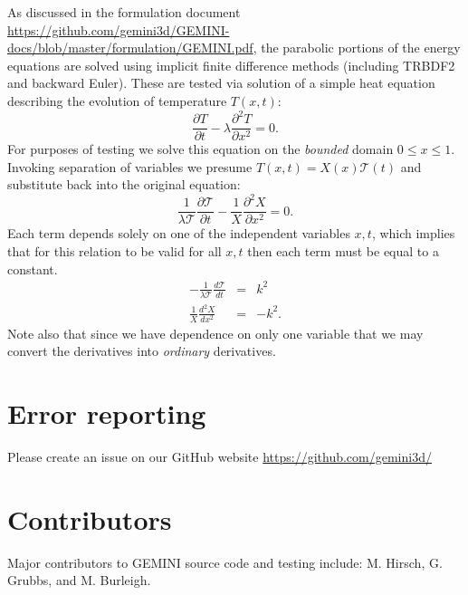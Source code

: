 \documentclass[11pt,letterpaper]{article}
\begin{document}
As discussed in the formulation document \url{https://github.com/gemini3d/GEMINI-docs/blob/master/formulation/GEMINI.pdf}, the parabolic portions of the energy equations are solved using implicit finite difference methods (including TRBDF2 and backward Euler).  These are tested via solution of a simple heat equation describing the evolution of temperature $T(x,t)$:
\begin{equation}
\frac{\partial T}{\partial t} - \lambda \frac{\partial^2 T}{\partial x^2} = 0.
\end{equation}
For purposes of testing we solve this equation on the \emph{bounded} domain $0 \le x \le 1$.  Invoking separation of variables we presume $T(x,t)=X(x) \mathcal{T}(t)$ and substitute back into the original equation:  
\begin{equation}
\frac{1}{\lambda \mathcal{T}} \frac{\partial \mathcal{T}}{\partial t} - \frac{1}{X} \frac{\partial^2 X}{\partial x^2} = 0.
\end{equation}
Each term depends solely on one of the independent variables $x,t$, which implies that for this relation to be valid for all $x,t$ then each term must be equal to a constant.  
\begin{eqnarray}
-\frac{1}{\lambda \mathcal{T}} \frac{d \mathcal{T}}{d t} &=& k^2 \\
\frac{1}{X} \frac{d^2 X}{d x^2} &=& -k^2.
\end{eqnarray}
Note also that since we have dependence on only one variable that we may convert the derivatives into \emph{ordinary} derivatives.


\section{Error reporting}

Please create an issue on our GitHub website \url{https://github.com/gemini3d/}


\section{Contributors}

Major contributors to GEMINI source code and testing include:  M. Hirsch, G. Grubbs, and M. Burleigh.


\pagebreak

%
\end{document}
